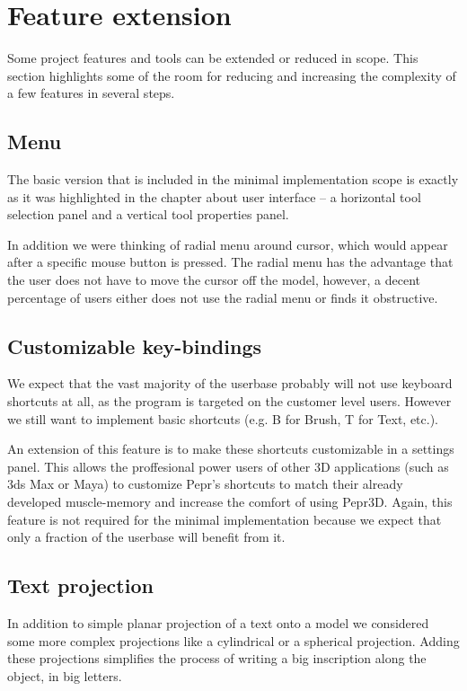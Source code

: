 \section{Feature extension}

Some project features and tools can be extended or reduced in scope. This section highlights some of the room for reducing and increasing the complexity of a few features in several steps.


\subsection{Menu}

The basic version that is included in the minimal implementation scope is exactly as it was highlighted in the chapter about user interface -- a horizontal tool selection panel and a vertical tool properties panel.

In addition we were thinking of radial menu around cursor, which would appear after a specific mouse button is pressed. The radial menu has the advantage that the user does not have to move the cursor off the model, however, a decent percentage of users either does not use the radial menu or finds it obstructive.

\subsection{Customizable key-bindings}
We expect that the vast majority of the userbase probably will not use keyboard shortcuts at all, as the program is targeted on the customer level users. However we still want to implement basic shortcuts (e.g. B for Brush, T for Text, etc.).

An extension of this feature is to make these shortcuts customizable in a settings panel. This allows the proffesional power users of other 3D applications (such as 3ds Max or Maya) to customize Pepr's shortcuts to match their already developed muscle-memory and increase the comfort of using Pepr3D. Again, this feature is not required for the minimal implementation because we expect that only a fraction of the userbase will benefit from it.


\subsection{Text projection}

In addition to simple planar projection of a text onto a model we considered some more complex projections like a cylindrical or a spherical projection. Adding these projections simplifies the process of writing a big inscription along the object, in big letters.

